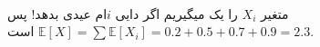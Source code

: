 \\
متغیر
$X_i$
را یک میگیریم اگر دایی
$i$ام
عیدی بدهد!
پس
$\mathbb{E} [X] = \sum \mathbb{E} [X_i] = 0.2 + 0.5 + 0.7 + 0.9 = 2.3$
است.

